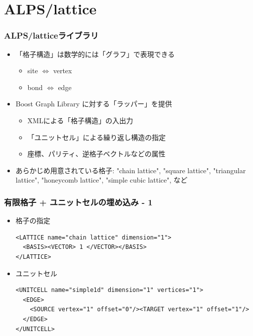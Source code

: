 \section{ALPS/lattice}
\begin{frame} [t,fragile]
  \frametitle{ALPS/latticeライブラリ}
  \begin{itemize}
    \setlength{\itemsep}{1em}
  \item 「格子構造」は数学的には「グラフ」で表現できる
    \begin{itemize}
    \item site $\Leftrightarrow$ vertex
    \item bond $\Leftrightarrow$ edge
    \end{itemize}
  \item Boost Graph Library に対する「ラッパー」を提供
    \begin{itemize}
    \item XMLによる「格子構造」の入出力
    \item 「ユニットセル」による繰り返し構造の指定
    \item 座標、パリティ、逆格子ベクトルなどの属性
    \end{itemize}
  \item あらかじめ用意されている格子: "chain lattice", "square lattice", "triangular lattice", "honeycomb lattice", "simple cubic lattice", など
  \end{itemize}
\end{frame}

\begin{frame}[t,fragile]
  \frametitle{有限格子 + ユニットセルの埋め込み - 1}
  \begin{itemize}
  \item 格子の指定
  \begin{lstlisting}
<LATTICE name="chain lattice" dimension="1">
  <BASIS><VECTOR> 1 </VECTOR></BASIS>
</LATTICE>
  \end{lstlisting}
  \item ユニットセル
  \begin{lstlisting}
<UNITCELL name="simple1d" dimension="1" vertices="1">
  <EDGE>
    <SOURCE vertex="1" offset="0"/><TARGET vertex="1" offset="1"/>
  </EDGE>
</UNITCELL>
  \end{lstlisting}
  \end{itemize}
\end{frame}

